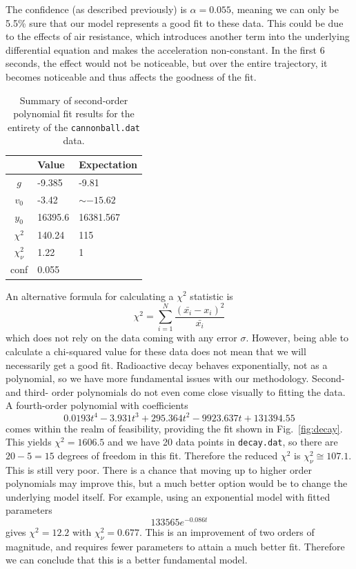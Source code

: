 \documentclass{article}
\begin{document}
The confidence (as described previously) is $\alpha=0.055$, meaning we can only be 5.5\% sure that our model represents a good fit to these data. This could be due to the effects of air resistance, which introduces another term into the underlying differential equation and makes the acceleration non-constant. In the first 6 seconds, the effect would not be noticeable, but over the entire trajectory, it becomes noticeable and thus affects the goodness of the fit.

\begin{table}[H]
    \centering
    \begin{tabular}{c|l|l}
         & Value & Expectation \\
        \hline
        $g$ & -9.385 & -9.81 \\
        $v_0$ & -3.42 & $\sim-15.62$ \\
        $y_0$ & 16395.6 & 16381.567 \\
        $\chi^2$ & 140.24 & 115 \\
        $\chi_\nu^2$ & 1.22 & 1 \\
        conf & 0.055 &
    \end{tabular}
    \caption{Summary of second-order polynomial fit results for the entirety of the \texttt{cannonball.dat} data.}
    \label{tab:fit1}
\end{table}

\bigskip
{}
\medskip

An alternative formula for calculating a $\chi^2$ statistic is \begin{equation*}
    \chi^2 = \sum_{i=1}^N \frac{(\bar{x_i}-x_i)^2}{\bar{x_i}}
\end{equation*}
which does not rely on the data coming with any error $\sigma$. However, being able to calculate a chi-squared value for these data does not mean that we will necessarily get a good fit. Radioactive decay behaves exponentially, not as a polynomial, so we have more fundamental issues with our methodology. Second- and third- order polynomials do not even come close visually to fitting the data. A fourth-order polynomial with coefficients \begin{equation*}
    0.0193t^4 - 3.931t^3 + 295.364t^2 - 9923.637t + 131394.55
\end{equation*}
comes within the realm of feasibility, providing the fit shown in Fig.~\ref{fig:decay}. This yields $\chi^2=1606.5$ and we have 20 data points in \texttt{decay.dat}, so there are $20-5=15$ degrees of freedom in this fit. Therefore the reduced $\chi^2$ is $\chi_\nu^2 \cong 107.1$. This is still very poor. There is a chance that moving up to higher order polynomials may improve this, but a much better option would be to change the underlying model itself. For example, using an exponential model with fitted parameters \begin{equation*}
    133565e^{-0.086t}
\end{equation*}
gives $\chi^2=12.2$ with $\chi_\nu^2 = 0.677$. This is an improvement of two orders of magnitude, and requires fewer parameters to attain a much better fit. Therefore we can conclude that this is a better fundamental model. 
\end{document}
